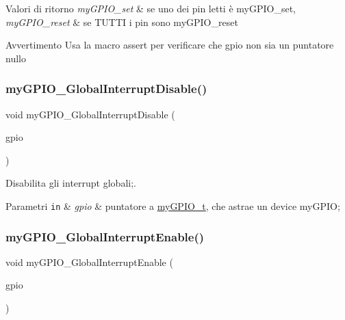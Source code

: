 \begin{DoxyRetVals}{Valori di ritorno}
{\em my\+G\+P\+I\+O\+\_\+set} & se uno dei pin letti è my\+G\+P\+I\+O\+\_\+set, \\
\hline
{\em my\+G\+P\+I\+O\+\_\+reset} & se T\+U\+T\+TI i pin sono my\+G\+P\+I\+O\+\_\+reset\\
\hline
\end{DoxyRetVals}
\begin{DoxyWarning}{Avvertimento}
Usa la macro assert per verificare che gpio non sia un puntatore nullo 
\end{DoxyWarning}
\mbox{\label{group__bare-metal_gaacca2871ac57a166e62bf431a2da7548}} 
\subsubsection{\texorpdfstring{my\+G\+P\+I\+O\+\_\+\+Global\+Interrupt\+Disable()}{myGPIO\_GlobalInterruptDisable()}}
{\footnotesize\ttfamily void my\+G\+P\+I\+O\+\_\+\+Global\+Interrupt\+Disable (\begin{DoxyParamCaption}\item[{\hyperlink{structmy_g_p_i_o__t}{my\+G\+P\+I\+O\+\_\+t} $\ast$}]{gpio }\end{DoxyParamCaption})}



Disabilita gli interrupt globali;. 


\begin{DoxyParams}[1]{Parametri}
\mbox{\tt in}  & {\em gpio} & puntatore a \hyperlink{structmy_g_p_i_o__t}{my\+G\+P\+I\+O\+\_\+t}, che astrae un device my\+G\+P\+IO; \\
\hline
\end{DoxyParams}
\mbox{\label{group__bare-metal_gada93ef6a9818e634f0a233ce14582216}} 
\subsubsection{\texorpdfstring{my\+G\+P\+I\+O\+\_\+\+Global\+Interrupt\+Enable()}{myGPIO\_GlobalInterruptEnable()}}
{\footnotesize\ttfamily void my\+G\+P\+I\+O\+\_\+\+Global\+Interrupt\+Enable (\begin{DoxyParamCaption}\item[{\hyperlink{structmy_g_p_i_o__t}{my\+G\+P\+I\+O\+\_\+t} $\ast$}]{gpio }\end{DoxyParamCaption})}



